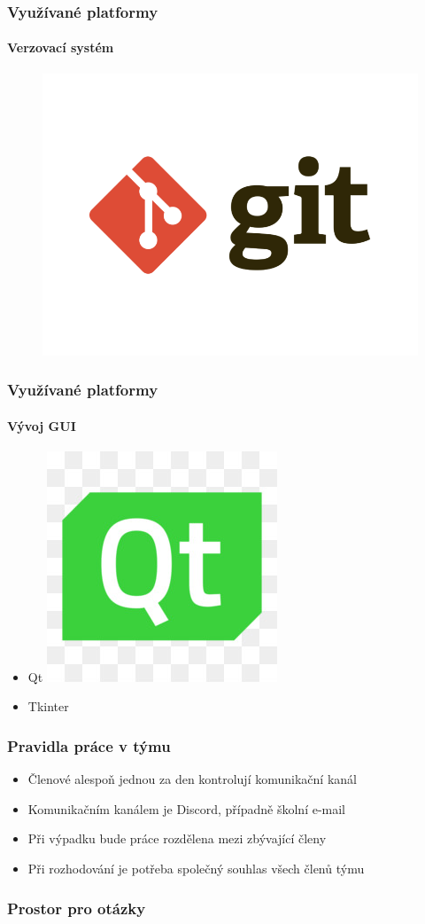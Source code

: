 \documentclass{beamer}
\begin{document}
		\begin{frame}
		\frametitle{Využívané platformy}
		\framesubtitle{Verzovací systém}
		\begin{figure}[h]
		\centering
			\includegraphics[scale=0.5]{git.png}
		\end{figure}
	\end{frame}

	\begin{frame}
		\frametitle{Využívané platformy}
		\framesubtitle{Vývoj GUI}
		\begin{itemize}
			\item Qt
			    \includegraphics[scale=0.1]{pyqt.jpg}
			\item Tkinter
			  


		\end{itemize}
	\end{frame}				
			
	\begin{frame}
		\frametitle{Pravidla práce v týmu}
		\begin{itemize}
			\item Členové alespoň jednou za den kontrolují komunikační kanál
			\item Komunikačním kanálem je Discord, případně školní e-mail
			\item Při výpadku bude práce rozdělena mezi zbývající členy
			\item Při rozhodování je potřeba společný souhlas všech členů týmu
		\end{itemize}
	\end{frame}				
			
	\begin{frame}
		\frametitle{Prostor pro otázky}
	\end{frame}
\end{document}
